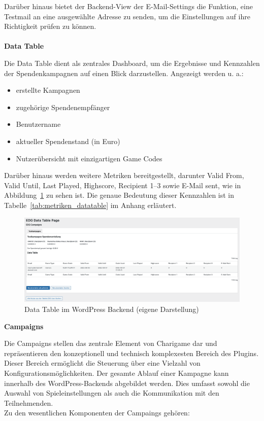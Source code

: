 Darüber hinaus bietet der Backend-View der E-Mail-Settings die Funktion, eine Testmail an eine ausgewählte Adresse zu senden, um die Einstellungen auf ihre Richtigkeit prüfen zu können.
\\\\
\textbf{Data Table}

Die Data Table dient als zentrales Dashboard, um die Ergebnisse und Kennzahlen der Spendenkampagnen auf einen Blick darzustellen.
Angezeigt werden u. a.:
\begin{itemize}
    \item erstellte Kampagnen
    \item zugehörige Spendenempfänger
    \item Benutzername
    \item aktueller Spendenstand (in Euro)
    \item Nutzerübersicht mit einzigartigen Game Codes
\end{itemize}
Darüber hinaus werden weitere Metriken bereitgestellt, darunter Valid From, Valid Until, Last Played, Highscore, Recipient 1–3 sowie E-Mail sent, wie in Abbildung~\ref{fig:datatable-backend-legacy} zu sehen ist.
Die genaue Bedeutung dieser Kennzahlen ist in Tabelle~\ref{tab:metriken_datatable} im Anhang erläutert.

\begin{figure}[H]
    \centering
    \includegraphics[width=1\textwidth]{images/legacy_datatable_backend}
    \caption{Data Table im WordPress Backend (eigene Darstellung)}
    \label{fig:datatable-backend-legacy}
\end{figure}

\textbf{Campaigns}

Die Campaigns stellen das zentrale Element von Charigame dar und repräsentieren den konzeptionell und technisch komplexesten Bereich des Plugins.
Dieser Bereich ermöglicht die Steuerung über eine Vielzahl von Konfigurationsmöglichkeiten.
Der gesamte Ablauf einer Kampagne kann innerhalb des WordPress-Backends abgebildet werden.
Dies umfasst sowohl die Auswahl von Spieleinstellungen als auch die Kommunikation mit den Teilnehmenden.
\\
Zu den wesentlichen Komponenten der Campaings gehören:

